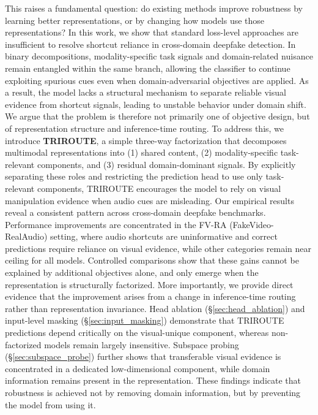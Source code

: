 \documentclass{article}
\begin{document}
This raises a fundamental question: do existing methods improve robustness by learning better representations, or by changing how models use those representations?
In this work, we show that standard loss-level approaches are insufficient to resolve shortcut reliance in cross-domain deepfake detection. In binary decompositions, modality-specific task signals and domain-related nuisance remain entangled within the same branch, allowing the classifier to continue exploiting spurious cues even when domain-adversarial objectives are applied. As a result, the model lacks a structural mechanism to separate reliable visual evidence from shortcut signals, leading to unstable behavior under domain shift.
We argue that the problem is therefore not primarily one of objective design, but of representation structure and inference-time routing. To address this, we introduce \textbf{TRIROUTE}, a simple three-way factorization that decomposes multimodal representations into (1) shared content, (2) modality-specific task-relevant components, and (3) residual domain-dominant signals. By explicitly separating these roles and restricting the prediction head to use only task-relevant components, TRIROUTE encourages the model to rely on visual manipulation evidence when audio cues are misleading.
Our empirical results reveal a consistent pattern across cross-domain deepfake benchmarks. Performance improvements are concentrated in the FV-RA (FakeVideo-RealAudio) setting, where audio shortcuts are uninformative and correct predictions require reliance on visual evidence, while other categories remain near ceiling for all models. Controlled comparisons show that these gains cannot be explained by additional objectives alone, and only emerge when the representation is structurally factorized.
More importantly, we provide direct evidence that the improvement arises from a change in inference-time routing rather than representation invariance. Head ablation (\S\ref{sec:head_ablation}) and input-level masking (\S\ref{sec:input_masking}) demonstrate that TRIROUTE predictions depend critically on the visual-unique component, whereas non-factorized models remain largely insensitive. Subspace probing (\S\ref{sec:subspace_probe}) further shows that transferable visual evidence is concentrated in a dedicated low-dimensional component, while domain information remains present in the representation. These findings indicate that robustness is achieved not by removing domain information, but by preventing the model from using it.
\end{document}
